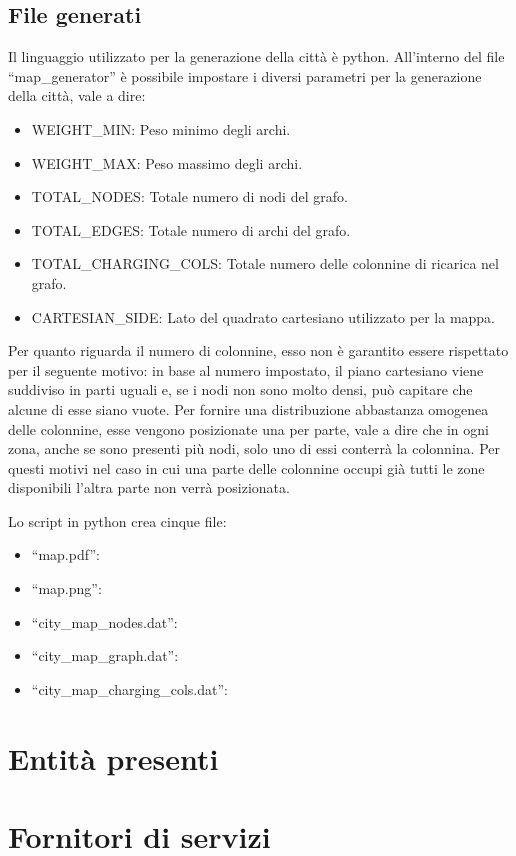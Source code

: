 \subsection{File generati}
Il linguaggio utilizzato per la generazione della città è python. All'interno del file ``map\_generator'' è possibile impostare i diversi parametri per la generazione della città, vale a dire:
\begin{itemize}
\item WEIGHT\_MIN: Peso minimo degli archi.
\item WEIGHT\_MAX:  Peso massimo degli archi.
\item TOTAL\_NODES: Totale numero di nodi del grafo.
\item TOTAL\_EDGES:  Totale numero di archi del grafo.
\item TOTAL\_CHARGING\_COLS:  Totale numero delle colonnine di ricarica nel grafo.
\item CARTESIAN\_SIDE:  Lato del quadrato cartesiano utilizzato per la mappa.
\end{itemize}

Per quanto riguarda il numero di colonnine, esso non è garantito essere rispettato per il seguente motivo: in base al numero impostato, il piano cartesiano viene suddiviso in parti uguali e, se i nodi non sono molto densi, può capitare che alcune di esse siano vuote. Per fornire una distribuzione abbastanza omogenea delle colonnine, esse vengono posizionate una per parte, vale a dire che in ogni zona, anche se sono presenti più nodi, solo uno di essi conterrà la colonnina. Per questi motivi nel caso in cui una parte delle colonnine occupi già tutti le zone disponibili l'altra parte non verrà posizionata.

Lo script in python crea cinque file:
\begin{itemize}
	\item ``map.pdf'': 
	\item ``map.png'':
	\item ``city\_map\_nodes.dat'':
	\item ``city\_map\_graph.dat'':
	\item ``city\_map\_charging\_cols.dat'':
\end{itemize}

\section{Entità presenti}

\section{Fornitori di servizi}

